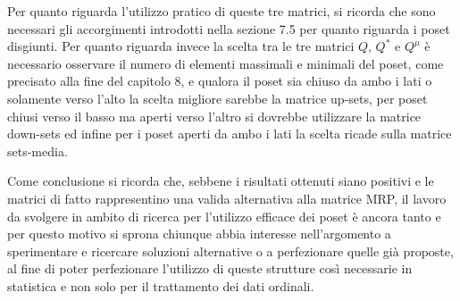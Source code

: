 \documentclass{report}
\begin{document}
Per quanto riguarda l'utilizzo pratico di queste tre matrici, si ricorda che sono necessari gli accorgimenti introdotti nella sezione 7.5 per quanto riguarda i poset disgiunti. Per quanto riguarda invece la scelta tra le tre matrici $Q$, $Q^{*}$ e $Q^{\mu}$ è necessario osservare il numero di elementi massimali e minimali del poset, come precisato alla fine del capitolo 8, e qualora il poset sia chiuso da ambo i lati o solamente verso l'alto la scelta migliore sarebbe la matrice up-sets, per poset chiusi verso il basso ma aperti verso l'altro si dovrebbe utilizzare la matrice down-sets ed infine per i poset aperti da ambo i lati la scelta ricade sulla matrice sets-media.


Come conclusione si ricorda che, sebbene i risultati ottenuti siano positivi e le matrici di fatto rappresentino una valida alternativa alla matrice MRP, il lavoro da svolgere in ambito di ricerca per l'utilizzo efficace dei poset è ancora tanto e per questo motivo si sprona chiunque abbia interesse nell'argomento a sperimentare e ricercare soluzioni alternative o a perfezionare quelle già proposte, al fine di poter perfezionare l'utilizzo di queste strutture così necessarie in statistica e non solo per il trattamento dei dati ordinali.





\end{document}
